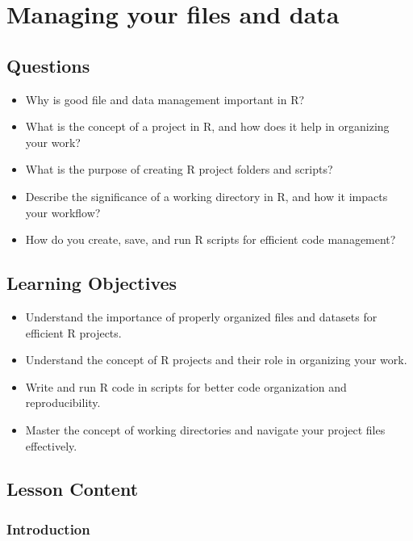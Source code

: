 \documentclass[
  letterpaper,
  DIV=11,
  numbers=noendperiod]{scrreprt}
\begin{document}

\chapter{Managing your files and data}\label{sec-managing}

\section{Questions}\label{questions-3}

\begin{itemize}
\item
  Why is good file and data management important in R?
\item
  What is the concept of a project in R, and how does it help in
  organizing your work?
\item
  What is the purpose of creating R project folders and scripts?
\item
  Describe the significance of a working directory in R, and how it
  impacts your workflow?
\item
  How do you create, save, and run R scripts for efficient code
  management?
\end{itemize}

\section{Learning Objectives}\label{learning-objectives-3}

\begin{itemize}
\item
  Understand the importance of properly organized files and datasets for
  efficient R projects.
\item
  Understand the concept of R projects and their role in organizing your
  work.
\item
  Write and run R code in scripts for better code organization and
  reproducibility.
\item
  Master the concept of working directories and navigate your project
  files effectively.
\end{itemize}

\section{Lesson Content}\label{lesson-content-3}

\subsection{Introduction}\label{introduction-2}
\end{document}
